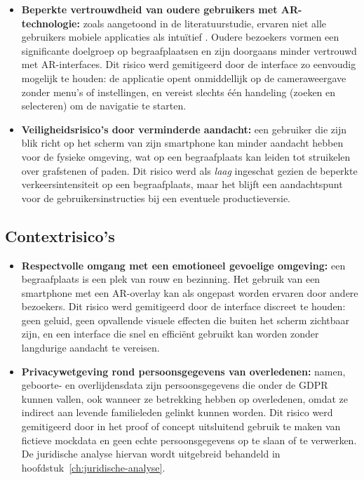 \begin{itemize}
    \item \textbf{Beperkte vertrouwdheid van oudere gebruikers met AR-technologie:} zoals aangetoond in de literatuurstudie, ervaren niet alle gebruikers mobiele applicaties als intuïtief \autocite{Haekkilae2022}. Oudere bezoekers vormen een significante doelgroep op begraafplaatsen en zijn doorgaans minder vertrouwd met AR-interfaces. Dit risico werd gemitigeerd door de interface zo eenvoudig mogelijk te houden: de applicatie opent onmiddellijk op de cameraweergave zonder menu's of instellingen, en vereist slechts één handeling (zoeken en selecteren) om de navigatie te starten.
    
    \item \textbf{Veiligheidsrisico's door verminderde aandacht:} een gebruiker die zijn blik richt op het scherm van zijn smartphone kan minder aandacht hebben voor de fysieke omgeving, wat op een begraafplaats kan leiden tot struikelen over grafstenen of paden. Dit risico werd als \textit{laag} ingeschat gezien de beperkte verkeersintensiteit op een begraafplaats, maar het blijft een aandachtspunt voor de gebruikersinstructies bij een eventuele productieversie.
\end{itemize}

\subsection{Contextrisico's}

\begin{itemize}
    \item \textbf{Respectvolle omgang met een emotioneel gevoelige omgeving:} een begraafplaats is een plek van rouw en bezinning. Het gebruik van een smartphone met een AR-overlay kan als ongepast worden ervaren door andere bezoekers. Dit risico werd gemitigeerd door de interface discreet te houden: geen geluid, geen opvallende visuele effecten die buiten het scherm zichtbaar zijn, en een interface die snel en efficiënt gebruikt kan worden zonder langdurige aandacht te vereisen.
    
    \item \textbf{Privacywetgeving rond persoonsgegevens van overledenen:} namen, geboorte- en overlijdensdata zijn persoonsgegevens die onder de GDPR kunnen vallen, ook wanneer ze betrekking hebben op overledenen, omdat ze indirect aan levende familieleden gelinkt kunnen worden. Dit risico werd gemitigeerd door in het proof of concept uitsluitend gebruik te maken van fictieve mockdata en geen echte persoonsgegevens op te slaan of te verwerken. De juridische analyse hiervan wordt uitgebreid behandeld in hoofdstuk~\ref{ch:juridische-analyse}.
\end{itemize}

